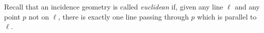 \documentclass{article}
\begin{document}

Recall that an incidence geometry is called \emph{euclidean} if, given any line $\ell$ and any point $p$ not on $\ell$, there is exactly one line passing through $p$ which is parallel to $\ell$.

\begin{prop}

\end{prop}
\end{document}
